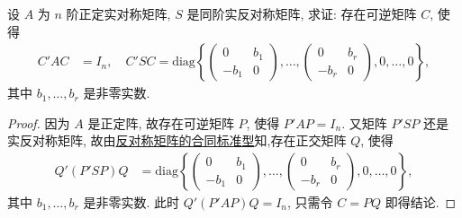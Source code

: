 \documentclass[../../main.tex]{subfiles}
\begin{document}
\begin{proposition}[正定阵与实反称阵可同时合同对角化]\label{proposition:正定阵与实反称阵可同时合同对角化-例9.114}
设 $A$ 为 $n$ 阶正定实对称矩阵, $S$ 是同阶实反对称矩阵, 求证: 存在可逆矩阵 $C$, 使得
\begin{align*}
C'AC &= I_n,\quad C'SC = \mathrm{diag}\left\{\begin{pmatrix}0 & b_1\\ -b_1 & 0\end{pmatrix},\dots,\begin{pmatrix}0 & b_r\\ -b_r & 0\end{pmatrix},0,\dots,0\right\},
\end{align*}
其中 $b_1,\dots,b_r$ 是非零实数.
\end{proposition}
\begin{proof}
因为 $A$ 是正定阵, 故存在可逆矩阵 $P$, 使得 $P'AP = I_n$. 又矩阵 $P'SP$ 还是实反对称矩阵, 故由\hyperref[theorem:反对称矩阵的合同标准型]{反对称矩阵的合同标准型}知,存在正交矩阵 $Q$, 使得
\begin{align*}
Q'(P'SP)Q &= \mathrm{diag}\left\{\begin{pmatrix}0 & b_1\\ -b_1 & 0\end{pmatrix},\dots,\begin{pmatrix}0 & b_r\\ -b_r & 0\end{pmatrix},0,\dots,0\right\},
\end{align*}
其中 $b_1,\dots,b_r$ 是非零实数. 此时 $Q'(P'AP)Q = I_n$, 只需令 $C = PQ$ 即得结论.

\end{proof}
\end{document}
